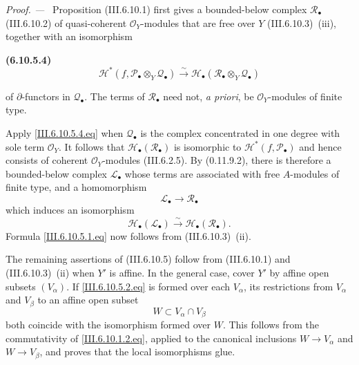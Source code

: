 \documentclass[10pt,oneside]{book}
\newcommand{\sh}[1]{\mathscr{#1}}
\newcommand{\sref}[2][]{(#2)}
\newenvironment{env}[1][]{\par\medskip\noindent\textbf{(#1)}\ }{\par}
\newenvironment{proof}{\par\medskip\noindent\textit{Proof. ---\ }}{\par}
\begin{document}
\begin{proof}
Proposition \sref{III.6.10.1} first gives a bounded-below
complex $\sh R_\bullet$ \sref{III.6.10.2} of quasi-coherent
$\sh O_Y$-modules that are free over $Y$
\sref{III.6.10.3}~(iii), together with an isomorphism
\begin{env}[6.10.5.4]
\label{III.6.10.5.4}
\[
  \sh H^*
  (f,\sh P_\bullet\otimes_Y\sh Q_\bullet)
  \xrightarrow{\sim}
  \sh H_\bullet
  (\sh R_\bullet\otimes_Y\sh Q_\bullet)
  \tag{6.10.5.4}\label{III.6.10.5.4.eq}
\]
\end{env}
of $\partial$-functors in $\sh Q_\bullet$.  The terms of
$\sh R_\bullet$ need not, \emph{a priori}, be
$\sh O_Y$-modules of finite type.

Apply \eqref{III.6.10.5.4.eq} when $\sh Q_\bullet$ is the
complex concentrated in one degree with sole term $\sh O_Y$.
It follows that $\sh H_\bullet(\sh R_\bullet)$ is isomorphic to
$\sh H^*(f,\sh P_\bullet)$ and hence consists of coherent
$\sh O_Y$-modules \sref{III.6.2.5}.  By
\sref[0]{0.11.9.2}, there is therefore a bounded-below complex
$\sh L_\bullet$ whose terms are associated with free
$A$-modules of finite type, and a homomorphism
\[
  \sh L_\bullet\longrightarrow\sh R_\bullet
\]
which induces an isomorphism
\[
  \sh H_\bullet(\sh L_\bullet)
  \xrightarrow{\sim}
  \sh H_\bullet(\sh R_\bullet).
\]
Formula \eqref{III.6.10.5.1.eq} now follows from
\sref{III.6.10.3}~(ii).

The remaining assertions of \sref{III.6.10.5} follow from
\sref{III.6.10.1} and \sref{III.6.10.3}~(ii) when $Y'$ is
affine.  In the general case, cover $Y'$ by affine open subsets
$(V_\alpha)$.  If
\eqref{III.6.10.5.2.eq} is formed over each $V_\alpha$, its
restrictions from $V_\alpha$ and $V_\beta$ to an affine open
subset
\[
  W\subset V_\alpha\cap V_\beta
\]
both coincide with the isomorphism formed over $W$.  This
follows from the commutativity of
\eqref{III.6.10.1.2.eq}, applied to the canonical inclusions
$W\to V_\alpha$ and $W\to V_\beta$, and proves that the local
isomorphisms glue.
\end{proof}
\end{document}
